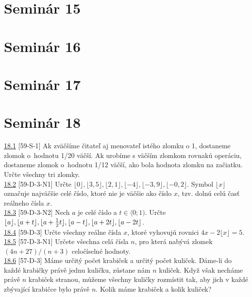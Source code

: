 \section*{Seminár 15}

\section*{Seminár 16}

\section*{Seminár 17}

\section*{Seminár 18}

\noindent \ul{18.1} [59-S-1]
 Ak zväčšíme čitateľ aj menovateľ istého zlomku o 1, dostaneme zlomok o~hodnotu 1/20 väčší. Ak urobíme s väčším zlomkom rovnakú operáciu, dostaneme zlomok o~hodnotu 1/12 väčší, ako bola hodnota zlomku na začiatku. Určte všechny tri zlomky.\\

\noindent \ul{18.2} [59-D-3-N1] Určte $\lfloor 0 \rfloor, \lfloor 3{,}5 \rfloor,\lfloor 2{,}1\rfloor, \lfloor -4 \rfloor, \lfloor -3{,}9 \rfloor, \lfloor -0{,}2\rfloor$. Symbol $\lfloor x\rfloor$ označuje najväčšie celé číslo, ktoré nie je väčšie ako číslo $x$, tzv. dolnú celú časť reálneho čísla $x$.\\

\noindent \ul{18.3} [59-D-3-N2] Nech $a$ je celé číslo a $t \in \langle 0; 1)$. Určte $\lfloor a \rfloor, \lfloor a+t \rfloor,\lfloor a+\frac{1}{2}t\rfloor, \lfloor a-t \rfloor, \\ \lfloor a+2t \rfloor, \lfloor a-2t\rfloor$.\\

\noindent \ul{18.4} [59-D-3]
Určte všechny reálne čísla $x$, ktoré vyhovujú rovnici $4x - 2\lfloor x\rfloor = 5$.\\

\noindent \ul{18.5} [57-D-3-N1] Určete všechna celá čísla $n$, pro která nabývá zlomek $(4n + 27)/(n + 3)$ celočíselné
hodnoty.\\

\noindent \ul{18.6} [57-D-3] Máme určitý počet krabiček a určitý počet kuliček. Dáme-li do každé
krabičky právě jednu kuličku, zůstane nám $n$ kuliček. Když však necháme právě $n$ krabiček stranou,
můžeme všechny kuličky rozmístit tak, aby jich v každé zbývající krabičce bylo právě $n$. Kolik máme
krabiček a kolik kuliček?\\

